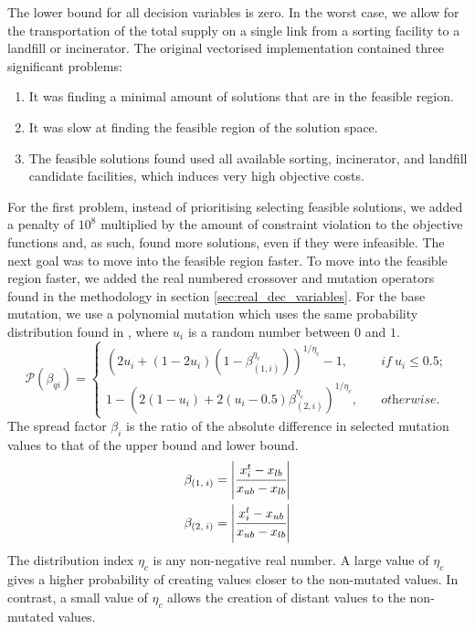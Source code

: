 \documentclass[mscthesis, 11pt]{usiinfthesis}
\theoremstyle{newdefinition}
\begin{document}
The lower bound for all decision variables is zero. In the worst case, we allow for the transportation of the total supply on a single link from a sorting facility to a landfill or incinerator.
The original vectorised implementation contained three significant problems:
\begin{enumerate}
    \item It was finding a minimal amount of solutions that are in the feasible region.
    \item It was slow at finding the feasible region of the solution space.
    \item The feasible solutions found used all available sorting, incinerator, and landfill candidate facilities, which induces very high objective costs.
\end{enumerate}
For the first problem, instead of prioritising selecting feasible solutions, we added a penalty of $10^8$ multiplied by the amount of constraint violation to the objective functions and, as such, found more solutions, even if they were infeasible. The next goal was to move into the feasible region faster. To move into the feasible region faster, we added the real numbered crossover and mutation operators found in the methodology in section \ref{sec:real_dec_variables}. For the base mutation, we use a polynomial mutation which uses the same probability distribution found in \cite{deb_self-adaptive_2007}, where $u_i$ is a random number between $0$ and $1$.
\begin{equation}\label{eq:sbx_prob}
    \mathcal{P}(\beta_{qi}) = 
    \begin{cases}
        (2 u_i + (1 - 2 u_i)(1-\beta_{(1, i)}^{\eta_c}))^{1/\eta_c} - 1, \quad &\textit{if} \: u_i \leq 0.5; \\
        1 - (2 (1 - u_i) + 2 (u_i - 0.5) \beta_{(2, i)}^{\eta_c})^{1/\eta_c}, \quad &\textit{otherwise}.
    \end{cases}
\end{equation}
The spread factor $\beta_i$ is the ratio of the absolute difference in selected mutation values to that of the upper bound and lower bound.
\begin{alignat}{2}
    \beta_{(1,\: i)} &= \left | \cfrac{x_i^t - x_{lb}}{x_{ub} - x_{lb}}\right| \\
     \beta_{(2, \: i)} &= \left| \cfrac{x_i^t - x_{ub}}{x_{ub} - x_{lb}}\right|
\end{alignat}
The distribution index $\eta_c$ is any non-negative real number. A large value of $\eta_c$ gives a higher probability of creating values closer to the non-mutated values. In contrast, a small value of $\eta_c$ allows the creation of distant values to the non-mutated values.
\end{document}
